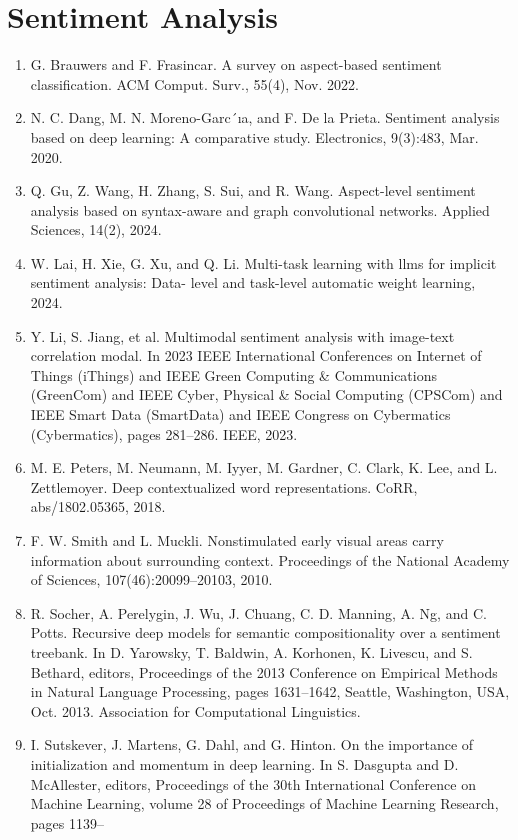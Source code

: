 \documentclass[]{article}
\begin{document}
\section{Sentiment Analysis}
\begin{enumerate}
\item G. Brauwers and F. Frasincar. A survey on aspect-based sentiment classification. ACM Comput. Surv.,
55(4), Nov. 2022.
\item N. C. Dang, M. N. Moreno-Garc´ıa, and F. De la Prieta. Sentiment analysis based on deep learning: A
comparative study. Electronics, 9(3):483, Mar. 2020.
\item Q. Gu, Z. Wang, H. Zhang, S. Sui, and R. Wang. Aspect-level sentiment analysis based on syntax-aware
and graph convolutional networks. Applied Sciences, 14(2), 2024.
\item W. Lai, H. Xie, G. Xu, and Q. Li. Multi-task learning with llms for implicit sentiment analysis: Data-
level and task-level automatic weight learning, 2024.
\item Y. Li, S. Jiang, et al. Multimodal sentiment analysis with image-text correlation modal. In 2023 IEEE
International Conferences on Internet of Things (iThings) and IEEE Green Computing \& Communications (GreenCom) and IEEE Cyber, Physical \& Social Computing (CPSCom) and IEEE Smart Data
(SmartData) and IEEE Congress on Cybermatics (Cybermatics), pages 281–286. IEEE, 2023.
\item M. E. Peters, M. Neumann, M. Iyyer, M. Gardner, C. Clark, K. Lee, and L. Zettlemoyer. Deep
contextualized word representations. CoRR, abs/1802.05365, 2018.
\item F. W. Smith and L. Muckli. Nonstimulated early visual areas carry information about surrounding
context. Proceedings of the National Academy of Sciences, 107(46):20099–20103, 2010.
\item R. Socher, A. Perelygin, J. Wu, J. Chuang, C. D. Manning, A. Ng, and C. Potts. Recursive deep models
for semantic compositionality over a sentiment treebank. In D. Yarowsky, T. Baldwin, A. Korhonen,
K. Livescu, and S. Bethard, editors, Proceedings of the 2013 Conference on Empirical Methods in
Natural Language Processing, pages 1631–1642, Seattle, Washington, USA, Oct. 2013. Association for
Computational Linguistics.
\item I. Sutskever, J. Martens, G. Dahl, and G. Hinton. On the importance of initialization and momentum
in deep learning. In S. Dasgupta and D. McAllester, editors, Proceedings of the 30th International
Conference on Machine Learning, volume 28 of Proceedings of Machine Learning Research, pages 1139–

\end{enumerate}
\end{document}

